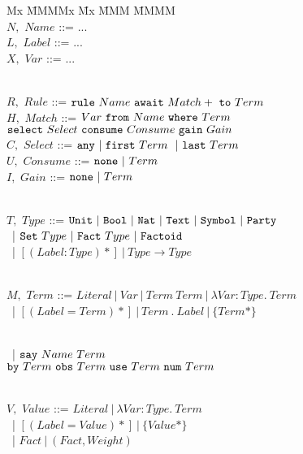 \begin{figure}
\begin{tabbing}
Mx \= MMMMx \= Mx \= MMM \= MMMM \kill
\\  $N,$ \> $Name$       \> ::= \> ...
\\  $L,$ \> $Label$      \> ::= \> ...
\\  $X,$ \> $Var$        \> ::= \> ...

\\[1ex]
    $R,$ \> $Rule$      \> ::= \> $\texttt{rule}~ Name~ \texttt{await}~ Match+~ \texttt{to}~ Term$
\\[0.5ex]
    $H,$ \> $Match$     \> ::= \> $Var~ \texttt{from}~ Name~ \texttt{where}~ Term$
\\      \>              \>     \> \hspace{1.6em}
                                  $\texttt{select}~ Select~ \texttt{consume}~ Consume~ \texttt{gain}~ Gain$
\\[0.5ex]
   $C,$ \> $Select$     \> ::= \> $\texttt{any}~ |~ \texttt{first}~ Term~ ~|~ \texttt{last}~ Term$
\\ $U,$ \> $Consume$    \> ::= \> $\texttt{none}~ |~ Term$
\\ $I,$ \> $Gain$       \> ::= \> $\texttt{none}~ |~ Term$

\\[1ex]
   $T,$ \> $Type$       \> ::= \> $\texttt{Unit}~ |~ \texttt{Bool}~ |~ \texttt{Nat}~ |~ \texttt{Text}~ |~ \texttt{Symbol}~ |~ \texttt{Party}$
\\ \>                   \> ~|  \> $\texttt{Set}~ Type~ |~ \texttt{Fact}~ Type~ |~ \texttt{Factoid}$
\\ \>                   \> ~|  \> $[ (Label : Type)* ] ~|~ Type \to Type~$

\\[1ex]
  $M,$   \> $Term$      \> ::= \> $Literal~ |~ Var~ |~ Term~ Term~ |~ \lambda Var : Type.~ Term$
\\ \>                   \> ~|  \> $[ (Label = Term)* ]~ |~ Term~ .~ Label ~|~ \{ Term* \}$

\\[0.5ex] \>            \> ~|  \> $\texttt{say}~ Name~ Term~$
\\        \>            \>     \> \hspace{0.5em} $\texttt{by}~ Term~ \texttt{obs}~ Term~ \texttt{use}~ Term~ \texttt{num}~ Term$

\\[1ex]
  $V,$   \> $Value$     \> ::= \> $Literal~ |~ \lambda Var : Type.~ Term$
\\       \>             \> ~|  \> $[ (Label = Value)* ] ~|~ \{ Value* \}$
\\       \>             \> ~|  \> $Fact ~|~ (Fact, Weight)$


\end{tabbing}
\end{figure}
